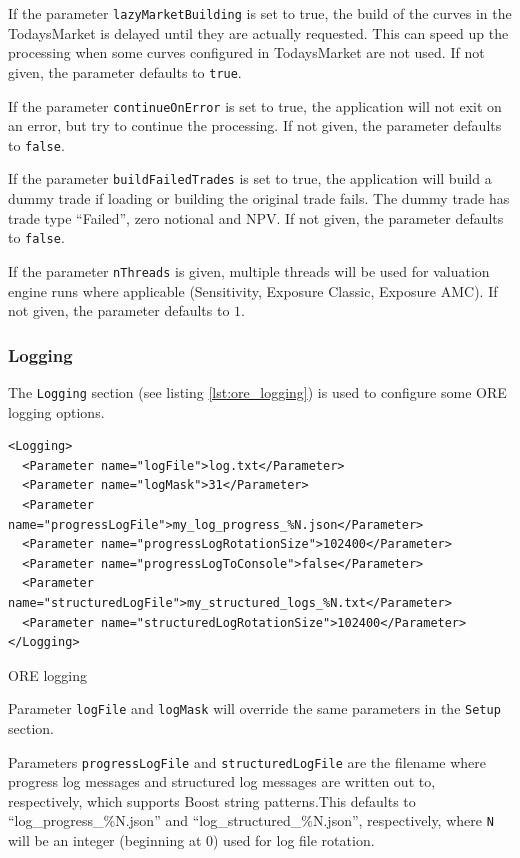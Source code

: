 \documentclass[12pt, a4paper]{article}
\begin{document}
\medskip If the parameter {\tt lazyMarketBuilding} is set to true, the build of the curves in the TodaysMarket is
delayed until they are actually requested. This can speed up the processing when some curves configured in TodaysMarket
are not used. If not given, the parameter defaults to {\tt true}.

\medskip If the parameter {\tt continueOnError} is set to true, the application will not exit on an error, but try to
continue the processing. If not given, the parameter defaults to {\tt false}.

\medskip If the parameter {\tt buildFailedTrades} is set to true, the application will build a dummy trade if loading or
building the original trade fails. The dummy trade has trade type ``Failed'', zero notional and NPV.
If not given, the parameter defaults to {\tt false}.

\medskip If the parameter {\tt nThreads} is given, multiple threads will be used for valuation engine runs where
applicable (Sensitivity, Exposure Classic, Exposure AMC). If not given, the parameter defaults to $1$.

\subsubsection{Logging}\label{sec:master_input_logging}

The {\tt Logging} section (see listing \ref{lst:ore_logging}) is used to configure some ORE logging options.

\begin{listing}[H]
\begin{verbatim}
<Logging>
  <Parameter name="logFile">log.txt</Parameter>
  <Parameter name="logMask">31</Parameter>
  <Parameter name="progressLogFile">my_log_progress_%N.json</Parameter>
  <Parameter name="progressLogRotationSize">102400</Parameter>
  <Parameter name="progressLogToConsole">false</Parameter>
  <Parameter name="structuredLogFile">my_structured_logs_%N.txt</Parameter>
  <Parameter name="structuredLogRotationSize">102400</Parameter>
</Logging>
\end{verbatim}
\caption{ORE logging}
\label{lst:ore_logging}
\end{listing}

Parameter {\tt logFile} and {\tt logMask} will override the same parameters in the {\tt Setup} section.

Parameters {\tt progressLogFile} and {\tt structuredLogFile} are the filename where progress log messages
and structured log messages are written out to, respectively, which supports Boost string patterns.This defaults to ``log\_progress\_\%N.json'' and ``log\_structured\_\%N.json'', respectively, where {\tt N} will be an integer (beginning at 0) used for log file rotation.
\end{document}
